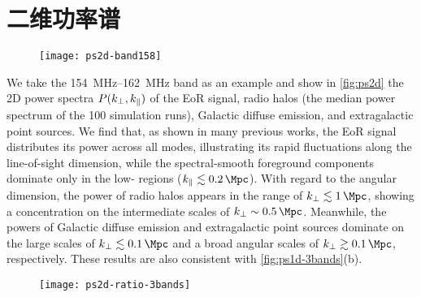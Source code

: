\section{二维功率谱}
\label{sec:ps2d}

\begin{figure}[htp]
  \centering
  \texttt{[image: ps2d-band158]}
  \label{fig:ps2d}
\end{figure}

We take the \SIrange{154}{162}{\MHz} band as an example and show in
\autoref{fig:ps2d} the 2D power spectra $P(k_{\perp}, k_{\parallel})$ of the EoR
signal, radio halos (the median power spectrum of the 100 simulation runs),
Galactic diffuse emission, and extragalactic point sources.
We find that, as shown in many previous works,
the EoR signal distributes its power across all \klos{} modes,
illustrating its rapid fluctuations along the line-of-sight dimension,
while the spectral-smooth foreground components dominate only in the
low-\klos{} regions ($\klos{} \lesssim \SI{0.2}{\per\Mpc}$).
With regard to the angular dimension, the power of radio halos appears in
the range of $\kperp \lesssim \SI{1}{\per\Mpc}$, showing a concentration
on the intermediate scales of $\kperp \sim \SI{0.5}{\per\Mpc}$.
Meanwhile, the powers of Galactic diffuse emission and extragalactic
point sources dominate on the large scales of
$\kperp \lesssim \SI{0.1}{\per\Mpc}$ and a broad angular scales of
$\kperp \gtrsim \SI{0.1}{\per\Mpc}$, respectively.
These results are also consistent with \autoref{fig:ps1d-3bands}(b).

\begin{figure}[htp]
  \centering
  \texttt{[image: ps2d-ratio-3bands]}
  \label{fig:ps2d-ratio}
\end{figure}

